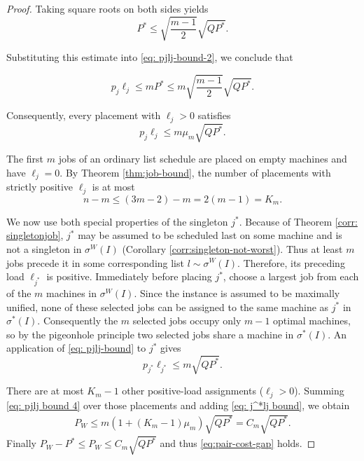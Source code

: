 \documentclass[%
english, titlepage=false %
]{./tum-templates/book/tumbook}
\begin{document}
\begin{proof}
\noindent
Taking square roots on both sides yields
\[
P^*
\le
\sqrt{\frac{m-1}{2}}\sqrt{QP^*}.
\]

\noindent
Substituting this estimate into \eqref{eq: pjlj-bound-2}, we conclude that

\begin{equation}
p_j\ell_j
\le mP^*
\le
m\sqrt{\frac{m-1}{2}}\sqrt{QP^*}.
\label{eq: pjlj bound 3}
\end{equation}


\noindent
Consequently, every placement with \(\ell_j>0\) satisfies
\begin{equation}
 p_j\ell_j\le m\mu_m\sqrt{QP^*}.
\label{eq: pjlj bound 4}
\end{equation}

The first \(m\) jobs of an ordinary list schedule are placed on empty
machines and have \(\ell_j=0\).  By Theorem \ref{thm:job-bound}, the number of placements with strictly
positive $\ell_j$ is at most
\[
 n-m\le (3m-2)-m =2(m-1) =K_m.
\]

We now use both special properties of the singleton $j^*$. Because of Theorem \ref{corr: singletonjob}, $j^*$ may be assumed to be scheduled last on some machine
and is not a singleton in $\sigma^{W}(I)$ (Corollary \ref{corr:singleton-not-worst}). Thus
at least $m$ jobs precede it in some corresponding list $l \sim \sigma^{W}(I)$. Therefore, its preceding load \(\ell_{j^*}\) is positive. Immediately before placing $j^*$,
choose a largest job from each of the \(m\) machines in $\sigma^{W}(I)$. Since the instance is assumed to be maximally unified, none of these
selected jobs can be assigned to the same machine as $j^*$ in $\sigma^*(I)$. Consequently the \(m\) selected jobs occupy only
\(m-1\) optimal machines, so by the pigeonhole principle two selected jobs share a machine in $\sigma^*(I)$.
An application of \eqref{eq: pjlj-bound} to $j^*$ gives
\begin{equation}
 p_{j^*}\ell_{j^*}\le m\sqrt{QP^*}.
 \label{eq: j^*lj bound}
\end{equation}

There are at most \(K_m-1\) other positive-load assignments ($\ell_j > 0$). Summing \eqref{eq: pjlj bound 4}
over those placements and adding \eqref{eq: j^*lj bound}, we obtain
\[
\begin{aligned}
 P_{W}
 \le
 m\left(1+(K_m-1)\mu_m\right)\sqrt{QP^*}
 =C_m\sqrt{QP^*}.
\end{aligned}
\]
Finally \(P_W-P^*\le P_W \le C_m \sqrt{QP^*}\) and thus \eqref{eq:pair-cost-gap} holds.
\end{proof}
\end{document}
